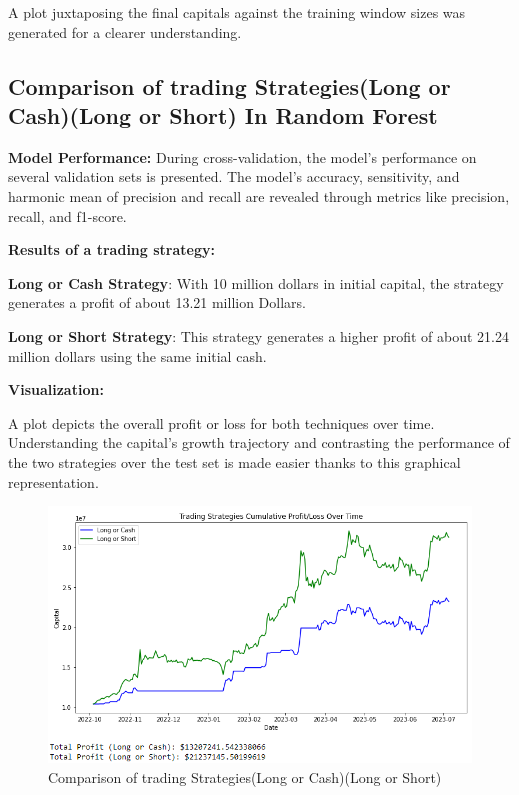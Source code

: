 A plot juxtaposing the final capitals against the training window sizes was generated for a clearer understanding.

\subsection{Comparison of trading Strategies(Long or Cash)(Long or Short) In Random Forest}

\textbf{Model Performance: }
During cross-validation, the model's performance on several validation sets is presented. The model's accuracy, sensitivity, and harmonic mean of precision and recall are revealed through metrics like precision, recall, and f1-score.

\textbf{Results of a trading strategy:}

\textbf{Long or Cash Strategy}: With 10 million dollars in initial capital, the strategy generates a profit of about 13.21 million Dollars.

\textbf{Long or Short Strategy}: This strategy generates a higher profit of about 21.24 million dollars using the same initial cash.

\textbf{Visualization: }

A plot depicts the overall profit or loss for both techniques over time. Understanding the capital's growth trajectory and contrasting the performance of the two strategies over the test set is made easier thanks to this graphical representation.

\begin{figure}[H]
\centering
\includegraphics[scale=0.85]{fig8.jpg}
\caption{Comparison of trading Strategies(Long or Cash)(Long or Short) }
\label{Comparison of trading Strategies(Long or Cash)(Long or Short)}
\end{figure}

